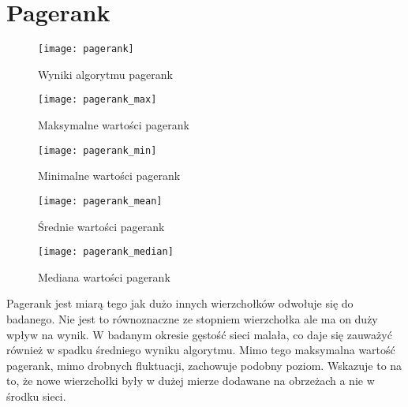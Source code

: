 \section{Pagerank}
\FloatBarrier
\begin{figure}[h]
	\centering
	\texttt{[image: pagerank]}
	\caption{Wyniki algorytmu pagerank}
\end{figure}
\FloatBarrier\FloatBarrier
\begin{figure}[h]
	\centering
	\texttt{[image: pagerank\_max]}
	\caption{Maksymalne wartości pagerank}
\end{figure}
\FloatBarrier\FloatBarrier
\begin{figure}[h]
	\centering
	\texttt{[image: pagerank\_min]}
	\caption{Minimalne wartości pagerank}
\end{figure}
\FloatBarrier\FloatBarrier
\begin{figure}[h]
	\centering
	\texttt{[image: pagerank\_mean]}
	\caption{Średnie wartości pagerank}
\end{figure}
\FloatBarrier\FloatBarrier
\begin{figure}[h]
	\centering
	\texttt{[image: pagerank\_median]}
	\caption{Mediana wartości pagerank}
\end{figure}
Pagerank jest miarą tego jak dużo innych wierzchołków odwołuje się do badanego. Nie jest to równoznaczne ze stopniem wierzchołka ale ma on duży wpływ na wynik. W badanym okresie gęstość sieci malała, co daje się zauważyć również w spadku średniego wyniku algorytmu. Mimo tego maksymalna wartość pagerank, mimo drobnych fluktuacji, zachowuje podobny poziom. Wskazuje to na to, że nowe wierzchołki były w dużej mierze dodawane na obrzeżach a nie w środku sieci.
\FloatBarrier
\newpage